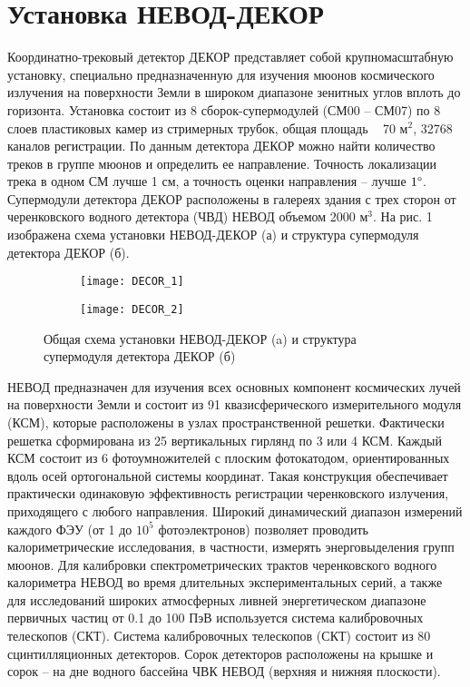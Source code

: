 \chapter*{Установка НЕВОД-ДЕКОР}
\label{ch:intro}

Координатно-трековый детектор ДЕКОР \cite{barbashina2000coordinate} представляет собой крупномасштабную установку, специально предназначенную для изучения мюонов космического излучения на поверхности Земли в широком диапазоне зенитных углов вплоть до горизонта. Установка состоит из 8 сборок-супермодулей (СМ00 – СМ07) по 8 слоев пластиковых камер из стримерных трубок, общая площадь ~ 70 м$^2$, 32768 каналов регистрации. По данным детектора ДЕКОР можно найти количество треков в группе мюонов и определить ее направление. Точность локализации трека в одном СМ лучше 1 см, а точность оценки направления – лучше $1\degree$. Супермодули детектора ДЕКОР расположены в галереях здания с трех сторон от черенковского водного детектора (ЧВД) НЕВОД объемом 2000 м$^3$. На рис. 1 изображена схема установки НЕВОД-ДЕКОР (а) и структура супермодуля детектора ДЕКОР (б).

\begin{figure}[ht]
	\centering
\hspace*{\fill}%
	\begin{subfigure}[b]{0.7\textwidth}
        \centering
		\texttt{[image: DECOR\_1]}
		\caption{}
		\label{fig:DECOR_1}
	\end{subfigure}
\hfill
	\begin{subfigure}[b]{0.29\textwidth}
        \centering
		\texttt{[image: DECOR\_2]}
        \caption{}
		\label{fig:DECOR_2}
	\end{subfigure}
\hspace*{\fill}%
	\caption{Общая схема установки НЕВОД-ДЕКОР (a) и структура супермодуля детектора ДЕКОР (б)}
	\label{fig:tiger}
\end{figure}

НЕВОД \cite{petrukhin2015cherenkov} предназначен для изучения всех основных компонент космических лучей на поверхности Земли и состоит из 91 квазисферического измерительного модуля (КСМ), которые расположены в узлах пространственной решетки. Фактически решетка сформирована из 25 вертикальных гирлянд по 3 или 4 КСМ. Каждый КСМ состоит из 6 фотоумножителей с плоским фотокатодом, ориентированных вдоль осей ортогональной системы координат. Такая конструкция обеспечивает практически одинаковую эффективность регистрации черенковского излучения, приходящего с любого направления. Широкий динамический диапазон измерений каждого ФЭУ (от 1 до $10^5$ фотоэлектронов) позволяет проводить калориметрические исследования, в частности, измерять энерговыделения групп мюонов. 
Для калибровки спектрометрических трактов черенковского водного калориметра НЕВОД во время длительных экспериментальных серий, а также для исследований широких атмосферных
ливней энергетическом диапазоне первичных частиц от 0.1 до 100 ПэВ используется система калибровочных телескопов (СКТ). Система калибровочных телескопов (СКТ) состоит из 80 сцинтилляционных детекторов. Сорок детекторов расположены на крышке и сорок – на дне водного бассейна ЧВК НЕВОД (верхняя и нижняя плоскости).

\endinput